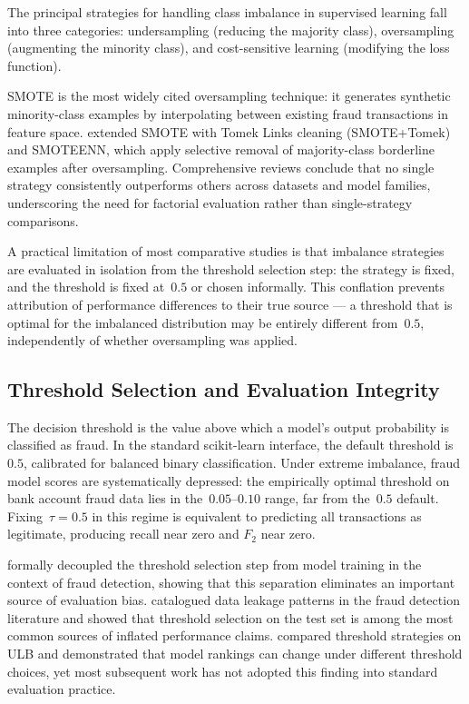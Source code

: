 \documentclass[a4paper,fleqn]{cas-sc}
\begin{document}
The principal strategies for handling class imbalance in supervised learning fall into
three categories: undersampling (reducing the majority class), oversampling (augmenting
the minority class), and cost-sensitive learning (modifying the loss function).

SMOTE \citep{chawla2002smote} is the most widely cited oversampling technique: it
generates synthetic minority-class examples by interpolating between existing fraud
transactions in feature space.
\citet{batista2004balancing} extended SMOTE with Tomek Links cleaning (SMOTE+Tomek) and
SMOTEENN, which apply selective removal of majority-class borderline examples after
oversampling.
Comprehensive reviews \citep{hegarcia2009learning, fernandez2018smote} conclude that
no single strategy consistently outperforms others across datasets and model families,
underscoring the need for factorial evaluation rather than single-strategy comparisons.

A practical limitation of most comparative studies is that imbalance strategies are
evaluated in isolation from the threshold selection step: the strategy is fixed, and
the threshold is fixed at~$0.5$ or chosen informally.
This conflation prevents attribution of performance differences to their true source ---
a threshold that is optimal for the imbalanced distribution may be entirely different
from~$0.5$, independently of whether oversampling was applied.

\subsection{Threshold Selection and Evaluation Integrity}

The decision threshold is the value above which a model's output probability is classified
as fraud.
In the standard scikit-learn interface, the default threshold is~$0.5$, calibrated for
balanced binary classification.
Under extreme imbalance, fraud model scores are systematically depressed: the empirically
optimal threshold on bank account fraud data lies in the~$0.05$--$0.10$ range, far from
the~$0.5$ default.
Fixing~$\tau=0.5$ in this regime is equivalent to predicting all transactions as
legitimate, producing recall near zero and $F_2$ near zero.

\citet{luzio2024decoupling} formally decoupled the threshold selection step from
model training in the context of fraud detection, showing that this separation eliminates
an important source of evaluation bias.
\citet{hayat2025leakage} catalogued data leakage patterns in the fraud detection
literature and showed that threshold selection on the test set is among the most common
sources of inflated performance claims.
\citet{dalpozzolo2017realistic} compared threshold strategies on ULB and demonstrated
that model rankings can change under different threshold choices, yet most subsequent
work has not adopted this finding into standard evaluation practice.
\end{document}
